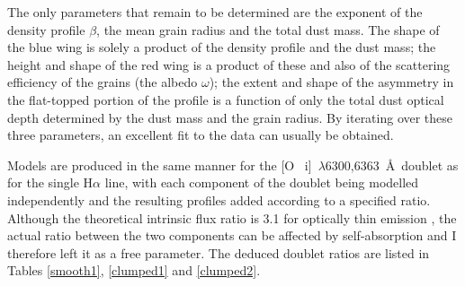 The only parameters that  remain to be determined are the exponent of 
the density profile $\beta$, the mean grain radius and the total dust 
mass.  The shape of the blue wing is solely a product of the density 
profile and the dust mass; the height and shape of the red wing is a 
product of these and also of the scattering efficiency of the grains (the 
albedo $\omega$); the extent and shape of the asymmetry in the flat-topped 
portion of the profile is a function of only the total dust optical depth 
determined by the dust mass and the grain radius.  By iterating over these 
three parameters, an excellent fit to the data can usually be 
obtained.

Models are produced in the same manner for the [O~{\sc 
i}]~$\lambda$6300,6363~\AA\ doublet as for the single H$\alpha$ line, with 
each component of the doublet being modelled independently and the 
resulting profiles added according to a specified ratio.  Although the 
theoretical intrinsic flux ratio is 3.1 for optically thin emission \citep{Storey2000}, the 
actual ratio between the two components can be affected by self-absorption 
\citep{Li1992} and I therefore left it as a free parameter.  The deduced 
doublet ratios are listed in Tables \ref{smooth1}, \ref{clumped1} and 
\ref{clumped2}.

